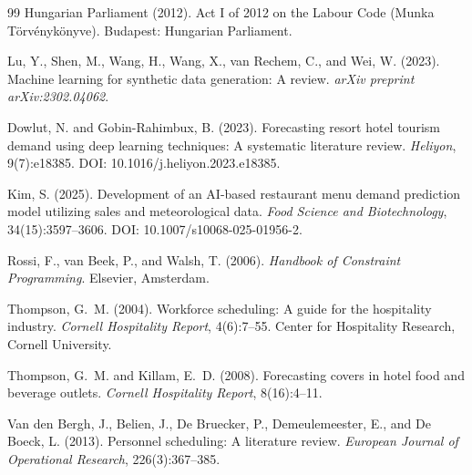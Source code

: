 \documentclass[12pt,a4paper,oneside]{article}
\begin{document}
\begin{thebibliography}{99}
Hungarian Parliament (2012).
\newblock Act {I} of 2012 on the Labour Code (Munka T\"{o}rv\'{e}nyk\"{o}nyve).
\newblock Budapest: Hungarian Parliament.

Lu, Y., Shen, M., Wang, H., Wang, X., van Rechem, C., and Wei, W. (2023).
\newblock Machine learning for synthetic data generation: A review.
\newblock \textit{arXiv preprint arXiv:2302.04062}.

Dowlut, N. and Gobin-Rahimbux, B. (2023).
\newblock Forecasting resort hotel tourism demand using deep learning
  techniques: A systematic literature review.
\newblock \textit{Heliyon}, 9(7):e18385.
\newblock DOI: 10.1016/j.heliyon.2023.e18385.

Kim, S. (2025).
\newblock Development of an {AI}-based restaurant menu demand prediction model
  utilizing sales and meteorological data.
\newblock \textit{Food Science and Biotechnology}, 34(15):3597--3606.
\newblock DOI: 10.1007/s10068-025-01956-2.

Rossi, F., van Beek, P., and Walsh, T. (2006).
\newblock \textit{Handbook of Constraint Programming}.
\newblock Elsevier, Amsterdam.

Thompson, G.~M. (2004).
\newblock Workforce scheduling: A guide for the hospitality industry.
\newblock \textit{Cornell Hospitality Report}, 4(6):7--55.
\newblock Center for Hospitality Research, Cornell University.

Thompson, G.~M. and Killam, E.~D. (2008).
\newblock Forecasting covers in hotel food and beverage outlets.
\newblock \textit{Cornell Hospitality Report}, 8(16):4--11.

Van den Bergh, J., Belien, J., De Bruecker, P., Demeulemeester, E., and De Boeck, L. (2013).
\newblock Personnel scheduling: A literature review.
\newblock \textit{European Journal of Operational Research}, 226(3):367--385.

\end{thebibliography}

\newpage
\appendix
{}
\end{document}
